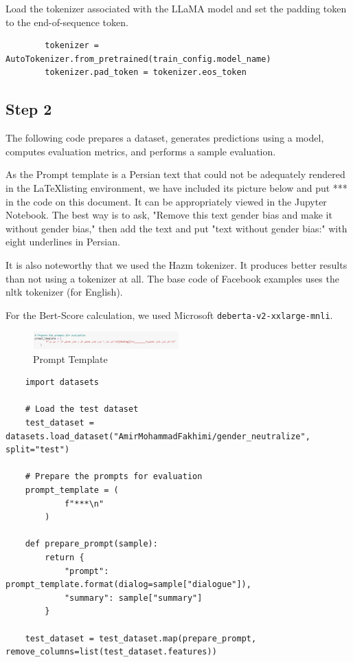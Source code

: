 \documentclass{solutionclass} %
\begin{document}
\begin{solution}
	Load the tokenizer associated with the LLaMA model and set the padding token to the end-of-sequence token.
	\begin{lstlisting}
		tokenizer = AutoTokenizer.from_pretrained(train_config.model_name)
		tokenizer.pad_token = tokenizer.eos_token
	\end{lstlisting}
\end{solution}


\subsection*{Step 2}

The following code prepares a dataset, generates predictions using a model, computes evaluation metrics, and performs a sample evaluation.

As the Prompt template is a Persian text that could not be adequately rendered in the \LaTeX listing environment, we have included its picture below and put *** in the code on this document. It can be appropriately viewed in the Jupyter Notebook. The best way is to ask, "Remove this text gender bias and make it without gender bias," then add the text and put "text without gender bias:" with eight underlines in Persian.

It is also noteworthy that we used the Hazm tokenizer. It produces better results than not using a tokenizer at all. The base code of Facebook examples uses the nltk tokenizer (for English).

For the Bert-Score calculation, we used Microsoft \verb|deberta-v2-xxlarge-mnli|.





\begin{figure}[h!]
	\caption{Prompt Template}
	\centering
	\includegraphics[width=0.5\textwidth]{img/Prompt.png}
\end{figure}



\begin{lstlisting}
	import datasets

	# Load the test dataset
	test_dataset = datasets.load_dataset("AmirMohammadFakhimi/gender_neutralize", split="test")
	
	# Prepare the prompts for evaluation
	prompt_template = (
			f"***\n"
		)
	
	def prepare_prompt(sample):
		return {
			"prompt": prompt_template.format(dialog=sample["dialogue"]),
			"summary": sample["summary"]
		}
	
	test_dataset = test_dataset.map(prepare_prompt, remove_columns=list(test_dataset.features))
\end{lstlisting}
\end{document}
